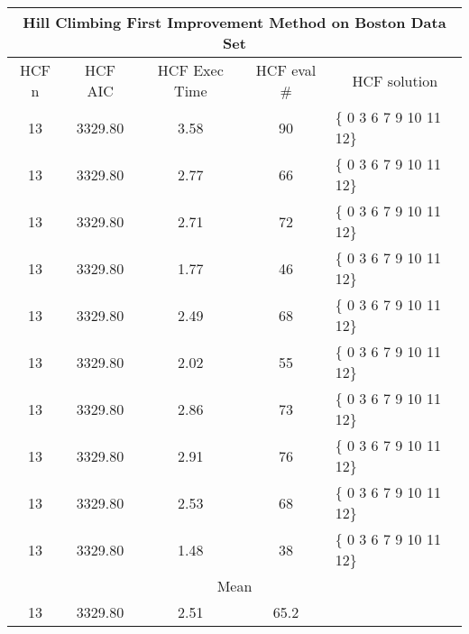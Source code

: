 \begin{tabular}{|c|c|c|c|l|}
	\hline
	\multicolumn{5}{|c|}{Hill Climbing First Improvement Method on Boston Data Set}                      \\ \hline
	HCF n & HCF AIC    & HCF Exec Time & HCF eval \# & \multicolumn{1}{c|}{HCF solution} \\ \hline
	13    & 3329.80 & 3.58              & 90                     & \{ 0 3 6 7 9 10 11 12\}           \\ \hline
	13    & 3329.80 & 2.77              & 66                     & \{ 0 3 6 7 9 10 11 12\}           \\ \hline
	13    & 3329.80 & 2.71              & 72                     & \{ 0 3 6 7 9 10 11 12\}           \\ \hline
	13    & 3329.80 & 1.77              & 46                     & \{ 0 3 6 7 9 10 11 12\}           \\ \hline
	13    & 3329.80 & 2.49              & 68                     & \{ 0 3 6 7 9 10 11 12\}           \\ \hline
	13    & 3329.80 & 2.02              & 55                     & \{ 0 3 6 7 9 10 11 12\}           \\ \hline
	13    & 3329.80 & 2.86              & 73                     & \{ 0 3 6 7 9 10 11 12\}           \\ \hline
	13    & 3329.80 & 2.91               & 76                     & \{ 0 3 6 7 9 10 11 12\}           \\ \hline
	13    & 3329.80 & 2.53              & 68                     & \{ 0 3 6 7 9 10 11 12\}           \\ \hline
	13    & 3329.80 & 1.48              & 38                     & \{ 0 3 6 7 9 10 11 12\}           \\ \hline
	\multicolumn{5}{|c|}{Mean}                                                                           \\ \hline
	13    & 3329.80 & 2.51             & 65.2                   &                                   \\ \hline
\end{tabular}

